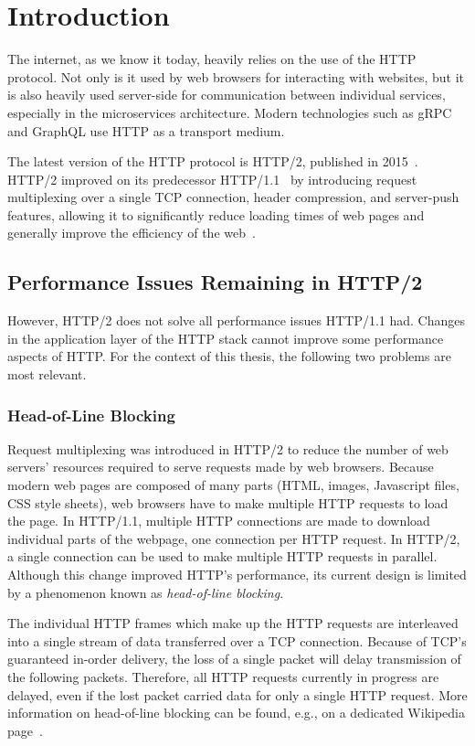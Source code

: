 \chapter{Introduction}

The internet, as we know it today, heavily relies on the use of the HTTP protocol. Not only is it
used by web browsers for interacting with websites, but it is also heavily used server-side for
communication between individual services, especially in the microservices architecture. Modern
technologies such as gRPC and GraphQL use HTTP as a transport medium.

The latest version of the HTTP protocol is HTTP/2, published in 2015~\cite{rfc7540}. HTTP/2 improved
on its predecessor HTTP/1.1~\cite{rfc7230} by introducing request multiplexing over a single TCP
connection, header compression, and server-push features, allowing it to significantly reduce
loading times of web pages and generally improve the efficiency of the web~\cite{deSaxce2015}.

\section{Performance Issues Remaining in HTTP/2}

However, HTTP/2 does not solve all performance issues HTTP/1.1 had. Changes in the application layer
of the HTTP stack cannot improve some performance aspects of HTTP. For the context of this thesis,
the following two problems are most relevant.

\subsection*{Head-of-Line Blocking}

Request multiplexing was introduced in HTTP/2 to reduce the number of web servers' resources
required to serve requests made by web browsers. Because modern web pages are composed of many parts
(HTML, images, Javascript files, CSS style sheets), web browsers have to make multiple HTTP requests
to load the page. In HTTP/1.1, multiple HTTP connections are made to download individual parts of
the webpage, one connection per HTTP request. In HTTP/2, a single connection can be used to make
multiple HTTP requests in parallel. Although this change improved HTTP's performance, its current
design is limited by a phenomenon known as \textit{head-of-line blocking}.

The individual HTTP frames which make up the HTTP requests are interleaved into a single stream of
data transferred over a TCP connection. Because of TCP's guaranteed in-order delivery, the loss of a
single packet will delay transmission of the following packets. Therefore, all HTTP requests
currently in progress are delayed, even if the lost packet carried data for only a single HTTP
request. More information on head-of-line blocking can be found, e.g., on a dedicated Wikipedia
page~\cite{wiki:head-of-line_blocking}.

